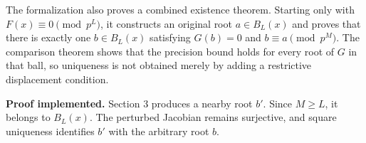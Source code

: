 The formalization also proves a combined existence theorem. Starting
only with \(F(x)\equiv0\pmod{p^L}\), it constructs an original root
\(a\in B_L(x)\) and proves that there is exactly one \(b\in B_L(x)\)
satisfying \(G(b)=0\) and \(b\equiv a\pmod{p^M}\). The comparison
theorem shows that the precision bound holds for every root of \(G\) in
that ball, so uniqueness is not obtained merely by adding a restrictive
displacement condition.

\textbf{Proof implemented.} Section 3 produces a nearby root \(b'\).
Since \(M\ge L\), it belongs to \(B_L(x)\). The perturbed Jacobian
remains surjective, and square uniqueness identifies \(b'\) with the
arbitrary root \(b\).
